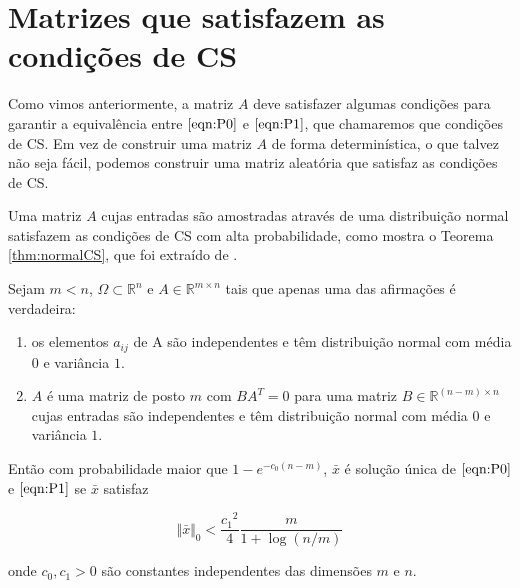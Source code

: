 \section{Matrizes que satisfazem as condições de CS}

Como vimos anteriormente, a matriz $A$ deve satisfazer algumas condições para garantir a equivalência entre $\eqref{eqn:P0}$ e $\eqref{eqn:P1}$, que chamaremos que condições de CS. Em vez de construir uma matriz $A$ de forma determinística, o que talvez não seja fácil, podemos construir uma matriz aleatória que satisfaz as condições de CS.



Uma matriz $A$ cujas entradas são amostradas através de uma distribuição normal satisfazem as condições de CS com alta probabilidade, como mostra o Teorema \ref{thm:normalCS}, que foi extraído de \cite{zhang2008theory}.

\begin{teorema} \cite{zhang2008theory} Sejam $m < n$, $\Omega \subset \mathbb{R}^n$ e $A \in \mathbb{R}^{m \times n}$ tais que apenas uma das afirmações é verdadeira:
\begin{enumerate}
\item os elementos $a_{ij}$ de A são independentes e têm distribuição normal com média $0$ e variância $1$.
\item $A$ é uma matriz de posto $m$ com $BA^{T} = 0$ para uma matriz $B \in \mathbb{R}^{(n - m) \times n}$ cujas entradas são independentes e têm distribuição normal com média $0$ e variância $1$.
\end{enumerate}
Então com probabilidade maior que $1 - e^{-c_0(n-m)}$, $\bar{x}$ é solução única de $\eqref{eqn:P0}$ e $\eqref{eqn:P1}$ se $\bar{x}$ satisfaz

$$ \Vert \bar{x} \Vert_0 < \frac{{c_1}^2}{4} \frac{m}{1 + \log(n/m)}$$

onde $c_0, c_1 > 0$ são constantes independentes das dimensões $m$ e $n$.
\label{thm:normalCS}
\end{teorema}